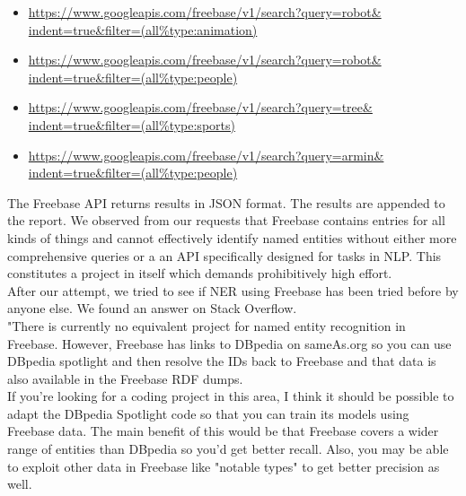 \documentclass[a4paper]{article}
\begin{document}
\begin{itemize}
\item \href{https://www.googleapis.com/freebase/v1/search?query=robot\&indent=true\&filter=(all\%20type:animation)}{https://www.googleapis.com/freebase/v1/search?query=robot\&\\indent=true\&filter=(all\%type:animation)}
\item \href{https://www.googleapis.com/freebase/v1/search?query=robot\&indent=true\&filter=(all\%20type:people)}{https://www.googleapis.com/freebase/v1/search?query=robot\&\\indent=true\&filter=(all\%type:people)}
\item \href{https://www.googleapis.com/freebase/v1/search?query=tree\&indent=true\&filter=(all\%20type:sports)}{https://www.googleapis.com/freebase/v1/search?query=tree\&\\indent=true\&filter=(all\%type:sports)}
\item \href{https://www.googleapis.com/freebase/v1/search?query=armin\&indent=true\&filter=(all\%20type:people)}{https://www.googleapis.com/freebase/v1/search?query=armin\&\\indent=true\&filter=(all\%type:people)}

\end{itemize}

The Freebase API returns results in JSON format. The results are appended to the report.  We observed from our requests that Freebase contains entries for all kinds of things and cannot effectively identify named entities without either more comprehensive queries or a an API specifically designed for tasks in NLP. This constitutes a project in itself which demands prohibitively high effort.   \\

After our attempt, we tried to see if NER using Freebase has been tried before by anyone else. We found an answer on Stack Overflow. \\

"There is currently no equivalent project for named entity recognition in Freebase. However, Freebase has links to DBpedia on sameAs.org so you can use DBpedia spotlight and then resolve the IDs back to Freebase and that data is also available in the Freebase RDF dumps. \\

If you're looking for a coding project in this area, I think it should be possible to adapt the DBpedia Spotlight code so that you can train its models using Freebase data. The main benefit of this would be that Freebase covers a wider range of entities than DBpedia so you'd get better recall. Also, you may be able to exploit other data in Freebase like "notable types" to get better precision as well.\\
\end{document}
